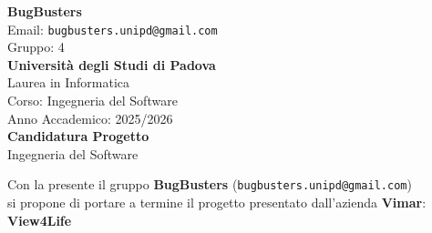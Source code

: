 \documentclass[a4paper,12pt]{article}
\begin{document}
\begin{center}
  
  {\Large\bfseries\color{primaryblue} BugBusters}\\[0.3cm]
  {\small\color{darkgray} Email: \texttt{bugbusters.unipd@gmail.com}} \\[0.1cm]
  {\small\color{darkgray} Gruppo: 4} \\[0.5cm]

  {\large\bfseries Università degli Studi di Padova}\\[0.3cm]
  {\small Laurea in Informatica}\\[0.2cm]
  {\small Corso: Ingegneria del Software}\\[0.2cm]
  {\small Anno Accademico: 2025/2026}\\[0.8cm]

  {\Huge\bfseries\color{primaryblue} Candidatura Progetto}\\[0.3cm]
  {\Large\color{secondaryblue} Ingegneria del Software}\\[0.8cm]
\end{center}

\begin{center}
\begin{tcolorbox}[colback=secondaryblue!10,colframe=secondaryblue,width=0.9\textwidth,arc=3mm,boxrule=0.8pt]
\centering
Con la presente il gruppo \textbf{BugBusters} (\texttt{bugbusters.unipd@gmail.com}) \\
si propone di portare a termine il progetto presentato dall'azienda \textbf{Vimar}: \\[0.3cm]
{\Large\bfseries\color{primaryblue} View4Life}
\end{tcolorbox}
\end{center}

\vspace{0.5cm}
\end{document}
